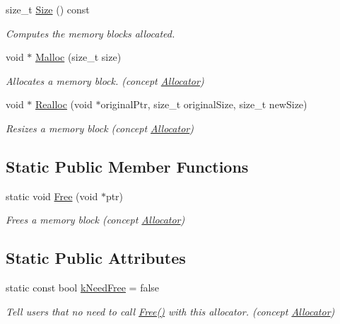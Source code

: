 \begin{DoxyCompactItemize}
size\+\_\+t \mbox{\hyperlink{classrapidjson_1_1_memory_pool_allocator_aa08b368c54e7643fcd23ef55139b9b40}{Size}} () const
\begin{DoxyCompactList}\small\item\em Computes the memory blocks allocated. \end{DoxyCompactList}\item 
void $\ast$ \mbox{\hyperlink{classrapidjson_1_1_memory_pool_allocator_a208c29e04b1d748bfe068444b7044344}{Malloc}} (size\+\_\+t size)
\begin{DoxyCompactList}\small\item\em Allocates a memory block. (concept \mbox{\hyperlink{classrapidjson_1_1_allocator}{Allocator}}) \end{DoxyCompactList}\item 
void $\ast$ \mbox{\hyperlink{classrapidjson_1_1_memory_pool_allocator_a880524b17bbecb5d2691b8075050d55d}{Realloc}} (void $\ast$original\+Ptr, size\+\_\+t original\+Size, size\+\_\+t new\+Size)
\begin{DoxyCompactList}\small\item\em Resizes a memory block (concept \mbox{\hyperlink{classrapidjson_1_1_allocator}{Allocator}}) \end{DoxyCompactList}\end{DoxyCompactItemize}
\subsection*{Static Public Member Functions}
\begin{DoxyCompactItemize}
\item 
static void \mbox{\hyperlink{classrapidjson_1_1_memory_pool_allocator_a9470dfeaeef3b3775249df2223129a2b}{Free}} (void $\ast$ptr)
\begin{DoxyCompactList}\small\item\em Frees a memory block (concept \mbox{\hyperlink{classrapidjson_1_1_allocator}{Allocator}}) \end{DoxyCompactList}\end{DoxyCompactItemize}
\subsection*{Static Public Attributes}
\begin{DoxyCompactItemize}
\item 
static const bool \mbox{\hyperlink{classrapidjson_1_1_memory_pool_allocator_a2606d96e19bcfc9d4bf58aefe55c1b29}{k\+Need\+Free}} = false
\begin{DoxyCompactList}\small\item\em Tell users that no need to call \mbox{\hyperlink{classrapidjson_1_1_memory_pool_allocator_a9470dfeaeef3b3775249df2223129a2b}{Free()}} with this allocator. (concept \mbox{\hyperlink{classrapidjson_1_1_allocator}{Allocator}}) \end{DoxyCompactList}\end{DoxyCompactItemize}
